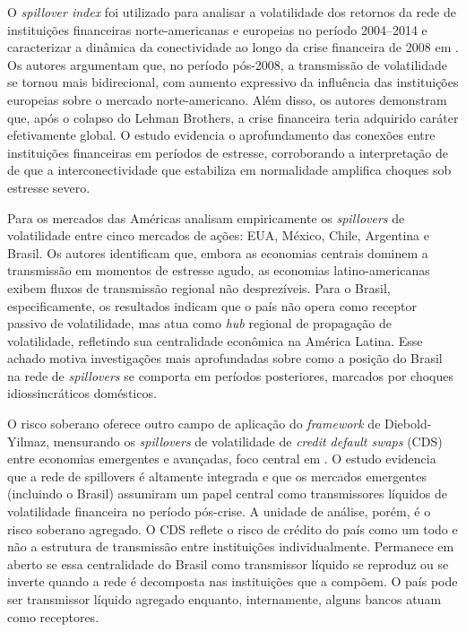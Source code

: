 \documentclass[12pt, a4paper, oneside, english, brazil]{abntex2}
\begin{document}
O \textit{spillover index} foi utilizado para analisar a volatilidade dos retornos da rede de 
instituições financeiras norte-americanas e europeias no período 2004--2014 e caracterizar a 
dinâmica da conectividade ao longo da crise financeira de 2008 em \textcite{diebold2016}. 
Os autores argumentam que, no período pós-2008, a transmissão de
volatilidade se tornou mais bidirecional, com aumento expressivo da influência das
instituições europeias sobre o mercado norte-americano. Além disso, os autores demonstram
que, após o colapso do Lehman Brothers, a crise financeira teria adquirido caráter
efetivamente global. O estudo evidencia o aprofundamento das conexões entre instituições
financeiras em períodos de estresse, corroborando a interpretação de
\textcite{acemoglu2015} de que a interconectividade que estabiliza em normalidade 
amplifica choques sob estresse severo.

Para os mercados das Américas \textcite{diebold2011} analisam empiricamente os 
\textit{spillovers} de volatilidade entre cinco mercados de ações: EUA, México, Chile, 
Argentina e Brasil. Os autores identificam que, embora as
economias centrais dominem a transmissão em momentos de estresse agudo, as economias
latino-americanas exibem fluxos de transmissão regional não desprezíveis. Para o Brasil,
especificamente, os resultados indicam que o país não opera como receptor passivo de
volatilidade, mas atua como \textit{hub} regional de propagação de volatilidade,
refletindo sua centralidade econômica na América Latina. Esse achado motiva investigações
mais aprofundadas sobre como a posição do Brasil na rede de \textit{spillovers} se
comporta em períodos posteriores, marcados por choques idiossincráticos domésticos.

O risco soberano oferece outro campo de aplicação do \textit{framework} de Diebold-Yilmaz, 
mensurando os \textit{spillovers} de volatilidade de \textit{credit default swaps} 
(CDS) entre economias emergentes e avançadas, foco central em \textcite{bostanci2020}.
O estudo evidencia que a rede de spillovers é altamente integrada e que os mercados emergentes
(incluindo o Brasil) assumiram um papel central como transmissores líquidos de volatilidade
financeira no período pós-crise. A unidade de análise, porém, é o risco soberano agregado.
O CDS reflete o risco de crédito do país como um todo e não a estrutura de transmissão 
entre instituições individualmente. Permanece em aberto se essa centralidade do Brasil 
como transmissor líquido se reproduz ou se inverte quando a rede é decomposta 
nas instituições que a compõem. O país pode ser transmissor líquido agregado 
enquanto, internamente, alguns bancos atuam como receptores.
\end{document}
